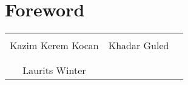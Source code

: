 \chapter{Foreword}


\phantom{Luft}

\phantom{Luft}

\begin{table}[H]
	\centering
		\begin{tabular}{c c c}
			\underline{\phantom{mmmmmmmmmmmmmmmmmmmmmm}} & \underline{\phantom{mmmmmmmmmmmmmmmmmmmmmm}} \\
			Kazim Kerem Kocan			& Khadar Guled\\
            \vspace{0.5cm}\\
            \underline{\phantom{mmmmmmmmmmmmmmmmmmmmmm}} \\
			Laurits Winter\\

		\end{tabular}
\end{table}